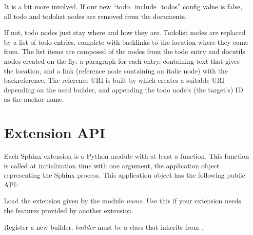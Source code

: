 \documentclass[letterpaper,10pt,english]{sphinxmanual}
\begin{document}
It is a bit more involved.  If our new ``todo\_include\_todos'' config value is
false, all todo and todolist nodes are removed from the documents.

If not, todo nodes just stay where and how they are.  Todolist nodes are
replaced by a list of todo entries, complete with backlinks to the location
where they come from.  The list items are composed of the nodes from the todo
entry and docutils nodes created on the fly: a paragraph for each entry,
containing text that gives the location, and a link (reference node containing
an italic node) with the backreference.  The reference URI is built by
 which creates a suitable URI depending on the
used builder, and appending the todo node's (the target's) ID as the anchor
name.


\section{Extension API}
\label{ext/appapi::doc}\label{ext/appapi:extension-api}
Each Sphinx extension is a Python module with at least a  function.
This function is called at initialization time with one argument, the
application object representing the Sphinx process.  This application object has
the following public API:

\begin{fulllineitems}
\label{ext/appapi:sphinx.application.Sphinx.setup_extension}
Load the extension given by the module \emph{name}.  Use this if your extension
needs the features provided by another extension.

\end{fulllineitems}


\begin{fulllineitems}
\label{ext/appapi:sphinx.application.Sphinx.add_builder}
Register a new builder.  \emph{builder} must be a class that inherits from
{\hyperref[ext/builderapi:sphinx.builders.Builder]{}}.

\end{fulllineitems}

\end{document}
